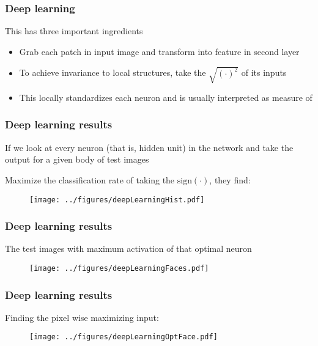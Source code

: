 \documentclass[12pt]{beamer}
\begin{document}
\begin{frame}[fragile]
\frametitle{Deep learning}
This has three important ingredients
\begin{itemize}
\item {} Grab each patch in input image and transform into feature in second
layer

\item {} To achieve invariance to local structures, take the $\sqrt{ (\cdot)^2}$ of its inputs
\item {} This locally standardizes each neuron and is usually interpreted as measure
of 

\end{itemize}
\end{frame}

\begin{frame}[fragile]
\frametitle{Deep learning results}
If we look at every neuron (that is, hidden unit) in the network and take the output for a given body of test images

\vsp
Maximize the classification rate of taking the $\textrm{sign}(\cdot)$, they find:
\begin{figure}
\centering
\texttt{[image: ../figures/deepLearningHist.pdf]}
\end{figure}
\end{frame}

\begin{frame}[fragile]
\frametitle{Deep learning results}
The test images with maximum activation of that optimal neuron
\begin{figure}
\centering
\texttt{[image: ../figures/deepLearningFaces.pdf]}
\end{figure}
\end{frame}

\begin{frame}[fragile]
\frametitle{Deep learning results}
Finding the pixel wise maximizing input:
\begin{figure}
\centering
\texttt{[image: ../figures/deepLearningOptFace.pdf]}
\end{figure}
\end{frame}
\end{document}
